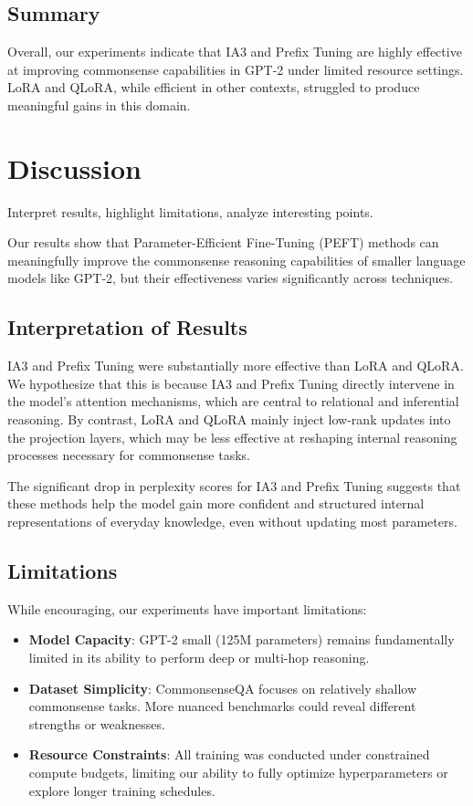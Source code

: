 \documentclass[11pt,twocolumn]{article}
\begin{document}
\subsection{Summary}
Overall, our experiments indicate that IA3 and Prefix Tuning are highly effective at improving commonsense capabilities in GPT-2 under limited resource settings. LoRA and QLoRA, while efficient in other contexts, struggled to produce meaningful gains in this domain.



\section{Discussion}
\label{sec:discussion}
Interpret results, highlight limitations, analyze interesting points.


Our results show that Parameter-Efficient Fine-Tuning (PEFT) methods can meaningfully improve the commonsense reasoning capabilities of smaller language models like GPT-2, but their effectiveness varies significantly across techniques.

\subsection{Interpretation of Results}
IA3 and Prefix Tuning were substantially more effective than LoRA and QLoRA. We hypothesize that this is because IA3 and Prefix Tuning directly intervene in the model’s attention mechanisms, which are central to relational and inferential reasoning. By contrast, LoRA and QLoRA mainly inject low-rank updates into the projection layers, which may be less effective at reshaping internal reasoning processes necessary for commonsense tasks.

The significant drop in perplexity scores for IA3 and Prefix Tuning suggests that these methods help the model gain more confident and structured internal representations of everyday knowledge, even without updating most parameters.

\subsection{Limitations}
While encouraging, our experiments have important limitations:
\begin{itemize}
    \item \textbf{Model Capacity}: GPT-2 small (125M parameters) remains fundamentally limited in its ability to perform deep or multi-hop reasoning.
    \item \textbf{Dataset Simplicity}: CommonsenseQA focuses on relatively shallow commonsense tasks. More nuanced benchmarks could reveal different strengths or weaknesses.
    \item \textbf{Resource Constraints}: All training was conducted under constrained compute budgets, limiting our ability to fully optimize hyperparameters or explore longer training schedules.
\end{itemize}
\end{document}
